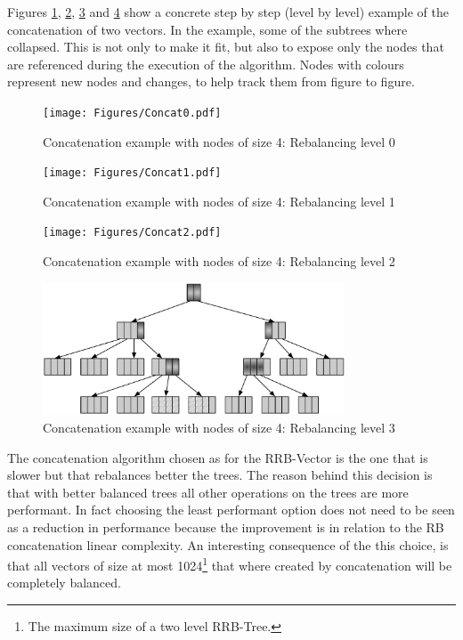 Figures \ref{Concat0Benchmarks}, \ref{Concat1Benchmarks}, \ref{Concat2Benchmarks} and \ref{Concat3Benchmarks} show a concrete step by step (level by level) example of the concatenation of two vectors. In the example, some of the subtrees where collapsed. This is not only to make it fit, but also to expose only the nodes that are referenced during the execution of the algorithm. Nodes with colours represent new nodes and changes, to help track them from figure to figure.

\begin{figure}[h!]
  \centering
  \texttt{[image: Figures/Concat0.pdf]}
  \caption{Concatenation example with nodes of size 4: Rebalancing level 0}
  \label{Concat0Benchmarks}
\end{figure}

\begin{figure}[h!]
  \centering
  \texttt{[image: Figures/Concat1.pdf]}
  \caption{Concatenation example with nodes of size 4: Rebalancing level 1}
  \label{Concat1Benchmarks}
\end{figure}

\begin{figure}[h!]
  \centering
  \texttt{[image: Figures/Concat2.pdf]}
  \caption{Concatenation example with nodes of size 4: Rebalancing level 2}
  \label{Concat2Benchmarks}
\end{figure}

\begin{figure}[h!]
  \centering
  \includegraphics[width=0.8\textwidth]{Figures/Concat3.pdf}
  \caption{Concatenation example with nodes of size 4: Rebalancing level 3}
  \label{Concat3Benchmarks}
\end{figure}

The concatenation algorithm chosen as for the RRB-Vector is the one that is slower but that rebalances better the trees. The reason behind this decision is that with better balanced trees all other operations on the trees are more performant. In fact choosing the least performant option does not need to be seen as a reduction in performance because the improvement is in relation to the RB concatenation linear complexity. An interesting consequence of the this choice, is that all vectors of size at most 1024\footnote{The maximum size of a two level RRB-Tree.} that where created by concatenation will be completely balanced.

